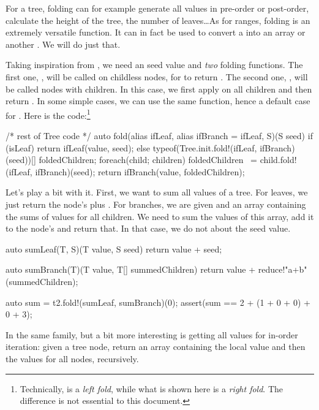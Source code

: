 For a tree, folding can for example generate all values in pre-order or post-order, calculate the height of the tree, the number of leaves\ldots As for ranges, folding is an extremely versatile function. It can in fact be used to convert a  into an array or another . We will do just that.

Taking inspiration from , we need an seed value and \emph{two} folding functions. The first one, , will be called on childless nodes, for  to return . The second one, , will be called nodes with children. In this case, we first apply  on all children and then return . In some simple cases, we can use the same function, hence a default case for . Here is the code:\footnote{ Technically,  is a \emph{left fold}, while what is shown here is a \emph{right fold}. The difference is not essential to this document.} 

\begin{dcode}
/* rest of Tree code */
auto fold(alias ifLeaf, alias ifBranch = ifLeaf, S)(S seed)
{
    if (isLeaf)
    {
        return ifLeaf(value, seed);
    }
    else
    {
        typeof(Tree.init.fold!(ifLeaf, ifBranch)(seed))[] foldedChildren;
        foreach(child; children) 
            foldedChildren ~= child.fold!(ifLeaf, ifBranch)(seed);
        return ifBranch(value, foldedChildren);
    }
}
\end{dcode}

Let's play a bit with it. First, we want to sum all values of a tree. For leaves, we just return the node's  plus . For branches, we are given  and an array containing the sums of values for all children. We need to sum the values of this array, add it to the node's  and return that. In that case, we do not about the seed value.

\begin{dcode}
auto sumLeaf(T, S)(T value, S seed)
{
    return value + seed;
}

auto sumBranch(T)(T value, T[] summedChildren)
{
    return value + reduce!"a+b"(summedChildren);
}

auto sum = t2.fold!(sumLeaf, sumBranch)(0);
assert(sum == 2 + (1 + 0 + 0) + 0 + 3);
\end{dcode}

In the same family, but a bit more interesting is getting all values for in-order iteration: given a tree node, return an array containing the local value and then the values for all nodes, recursively.

